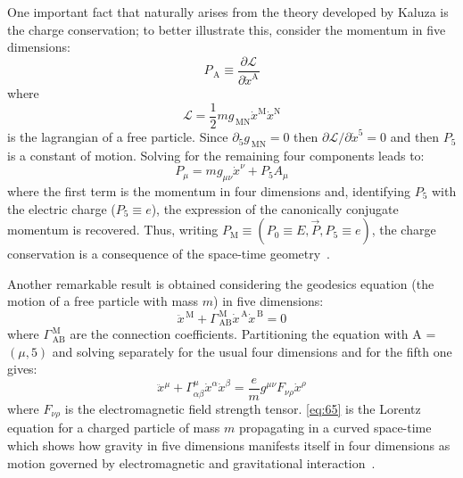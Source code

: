 One important fact that naturally arises from the theory developed by Kaluza is
the charge conservation; to better illustrate this, consider the momentum in
five dimensions:
\begin{equation}
  \label{eq:61}
  P_\mathrm{\, A} \equiv \frac{\partial \mathcal{L}}{\partial \dot{x}^\mathrm{A}}
\end{equation}
where
\begin{equation}
  \label{eq:62}
  \mathcal{L} = \frac{1}{2} m g_{\mathrm{\, MN}} \dot{x}^\mathrm{M} \dot{x}^\mathrm{N}
\end{equation}
is the lagrangian of a free particle. Since $\partial_5 g_{\mathrm{\, MN}} = 0$
then $\partial \mathcal{L}/ \partial \dot{x}^5 = 0$ and then $P_5$ is a constant
of motion. Solving for the remaining four components leads to:
\begin{equation}
  \label{eq:63}
  P_\mu = m g_{\mu\nu} \dot{x}^\nu + P_5 A_\mu
\end{equation}
where the first term is the momentum in four dimensions and, identifying $P_5$
with the electric charge ($P_5 \equiv e$), the expression of the canonically
conjugate momentum is recovered. Thus, writing $P_\mathrm{M} \equiv (P_0 \equiv
E, \vec{P}, P_5 \equiv e)$, the charge conservation is a consequence of the
space-time geometry~\cite{KKConsequences}.

Another remarkable result is obtained considering the geodesics equation (the
motion of a free particle with mass $m$) in five dimensions:
\begin{equation}
  \label{eq:64}
  \ddot{x}^\mathrm{\, M} + \Gamma^\mathrm{\, M}_{\mathrm{\, AB}}
  \dot{x}^\mathrm{\, A} \dot{x}^\mathrm{\, B} = 0
\end{equation}
where $\Gamma^\mathrm{\, M}_{\mathrm{\, AB}}$ are the connection
coefficients. Partitioning the equation with A = $(\mu, 5)$ and solving
separately for the usual four dimensions and for the fifth one gives:
\begin{equation}
  \label{eq:65}
  \ddot{x}^\mu + \Gamma^\mu_{\alpha \beta} \dot{x}^\alpha \dot{x}^\beta =
  \frac{e}{m} g^{\mu\nu} F_{\nu \rho} \dot{x}^\rho
\end{equation}
where $F_{\nu \rho}$ is the electromagnetic field strength tensor. \cref{eq:65}
is the Lorentz equation for a charged particle of mass $m$ propagating in a
curved space-time which shows how gravity in five dimensions manifests itself in
four dimensions as motion governed by electromagnetic and gravitational
interaction~\cite{KKConsequences}.


